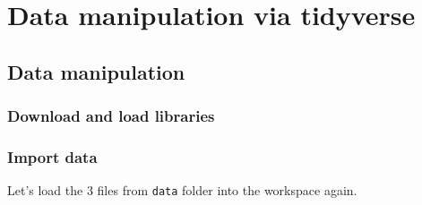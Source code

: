 \documentclass[
]{book}
\newenvironment{Shaded}{\begin{snugshade}}{\end{snugshade}}
\newcommand{\CommentTok}[1]{\textcolor[rgb]{0.56,0.35,0.01}{\textit{#1}}}
\newcommand{\ControlFlowTok}[1]{\textcolor[rgb]{0.13,0.29,0.53}{\textbf{#1}}}
\newcommand{\KeywordTok}[1]{\textcolor[rgb]{0.13,0.29,0.53}{\textbf{#1}}}
\newcommand{\NormalTok}[1]{#1}
\newcommand{\OperatorTok}[1]{\textcolor[rgb]{0.81,0.36,0.00}{\textbf{#1}}}
\newcommand{\StringTok}[1]{\textcolor[rgb]{0.31,0.60,0.02}{#1}}
\begin{document}
\hypertarget{part-data-manipulation-via-tidyverse}{%
\part{Data manipulation via tidyverse}\label{part-data-manipulation-via-tidyverse}}

\hypertarget{data-manipulation}{%
\chapter{Data manipulation}\label{data-manipulation}}

\hypertarget{download-and-load-libraries}{%
\section*{Download and load libraries}\label{download-and-load-libraries}}

\begin{Shaded}
\end{Shaded}

\hypertarget{import-data}{%
\section*{Import data}\label{import-data}}

Let's load the 3 files from \texttt{data} folder into the workspace again.
\end{document}

